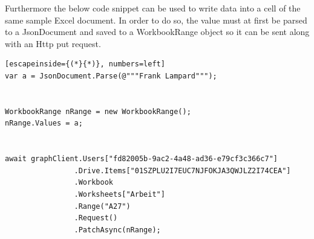 Furthermore the below code snippet can be used to write data into a cell of the same sample Excel document. In order to do so, the value must at first be parsed to a JsonDocument and saved to a WorkbookRange object so it can be sent along with an Http put request. 

\begin{lstlisting}[escapeinside={(*}{*)}, numbers=left]
var a = JsonDocument.Parse(@"""Frank Lampard""");

           
WorkbookRange nRange = new WorkbookRange();
nRange.Values = a;


await graphClient.Users["fd82005b-9ac2-4a48-ad36-e79cf3c366c7"]
                .Drive.Items["01SZPLU2I7EUC7NJFOKJA3QWJLZ2I74CEA"]
                .Workbook
                .Worksheets["Arbeit"]                
                .Range("A27")
                .Request()
                .PatchAsync(nRange);
\end{lstlisting}\\
